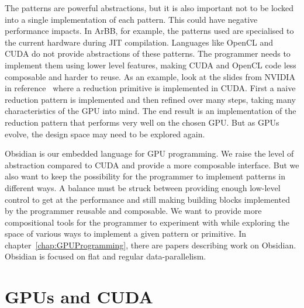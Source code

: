 \documentclass[a4paper]{book}
\begin{document}
The patterns are powerful abstractions, but it is also important not to be locked into 
a single implementation of each pattern. This could have negative performance impacts. 
In ArBB, for example, the patterns used are specialised to the current hardware during JIT 
compilation. Languages like OpenCL and CUDA do not provide abstractions of these patterns. 
The programmer needs to implement them using lower level features, making CUDA and OpenCL 
code less composable and harder to reuse. As an example, look at the slides from NVIDIA in 
reference~\citet{reduction} where a reduction primitive is implemented in CUDA. First a 
naive reduction pattern is implemented and then refined over many steps, taking many 
characteristics of the GPU into mind. The end result is an implementation of the 
reduction pattern that performs very well on the chosen GPU. But as GPUs evolve, the 
design space may need to be explored again. 

Obsidian is our embedded language for GPU programming. We raise the level of abstraction 
compared to CUDA and provide a more composable interface. But we also want to keep 
the possibility for the programmer to implement patterns in different ways. A balance 
must be struck between providing enough low-level control to get at the performance 
and still making building blocks implemented by the programmer reusable and composable. 
We want to provide more compositional tools for the programmer to experiment with while 
exploring the space of various ways to implement a given pattern or primitive. 
In chapter~\ref{chap:GPUProgramming}, there are papers describing work on Obsidian. 
Obsidian is focused on flat and regular data-parallelism. 



%
%
\section{GPUs and CUDA} 
\end{document}
